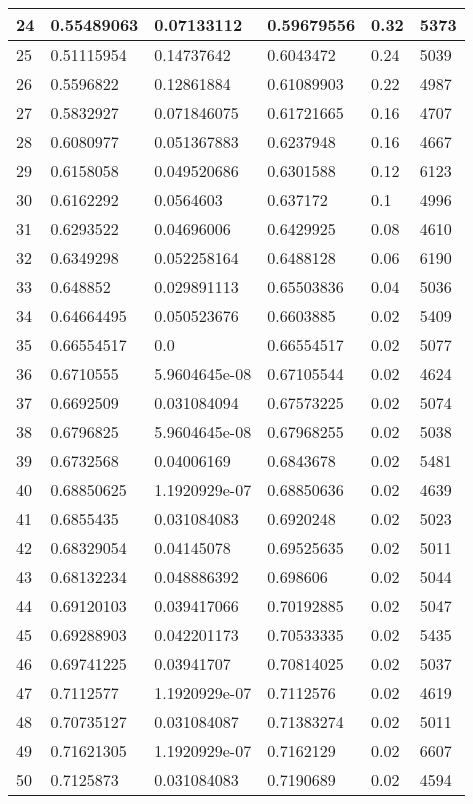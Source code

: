 \begin{longtable}{|l|l|l|l|l|l|}
24 & 0.55489063 & 0.07133112 & 0.59679556 & 0.32 & 5373 \\ \hline 
25 & 0.51115954 & 0.14737642 & 0.6043472 & 0.24 & 5039 \\ \hline 
26 & 0.5596822 & 0.12861884 & 0.61089903 & 0.22 & 4987 \\ \hline 
27 & 0.5832927 & 0.071846075 & 0.61721665 & 0.16 & 4707 \\ \hline 
28 & 0.6080977 & 0.051367883 & 0.6237948 & 0.16 & 4667 \\ \hline 
29 & 0.6158058 & 0.049520686 & 0.6301588 & 0.12 & 6123 \\ \hline 
30 & 0.6162292 & 0.0564603 & 0.637172 & 0.1 & 4996 \\ \hline 
31 & 0.6293522 & 0.04696006 & 0.6429925 & 0.08 & 4610 \\ \hline 
32 & 0.6349298 & 0.052258164 & 0.6488128 & 0.06 & 6190 \\ \hline 
33 & 0.648852 & 0.029891113 & 0.65503836 & 0.04 & 5036 \\ \hline 
34 & 0.64664495 & 0.050523676 & 0.6603885 & 0.02 & 5409 \\ \hline 
35 & 0.66554517 & 0.0 & 0.66554517 & 0.02 & 5077 \\ \hline 
36 & 0.6710555 & 5.9604645e-08 & 0.67105544 & 0.02 & 4624 \\ \hline 
37 & 0.6692509 & 0.031084094 & 0.67573225 & 0.02 & 5074 \\ \hline 
38 & 0.6796825 & 5.9604645e-08 & 0.67968255 & 0.02 & 5038 \\ \hline 
39 & 0.6732568 & 0.04006169 & 0.6843678 & 0.02 & 5481 \\ \hline 
40 & 0.68850625 & 1.1920929e-07 & 0.68850636 & 0.02 & 4639 \\ \hline 
41 & 0.6855435 & 0.031084083 & 0.6920248 & 0.02 & 5023 \\ \hline 
42 & 0.68329054 & 0.04145078 & 0.69525635 & 0.02 & 5011 \\ \hline 
43 & 0.68132234 & 0.048886392 & 0.698606 & 0.02 & 5044 \\ \hline 
44 & 0.69120103 & 0.039417066 & 0.70192885 & 0.02 & 5047 \\ \hline 
45 & 0.69288903 & 0.042201173 & 0.70533335 & 0.02 & 5435 \\ \hline 
46 & 0.69741225 & 0.03941707 & 0.70814025 & 0.02 & 5037 \\ \hline 
47 & 0.7112577 & 1.1920929e-07 & 0.7112576 & 0.02 & 4619 \\ \hline 
48 & 0.70735127 & 0.031084087 & 0.71383274 & 0.02 & 5011 \\ \hline 
49 & 0.71621305 & 1.1920929e-07 & 0.7162129 & 0.02 & 6607 \\ \hline 
50 & 0.7125873 & 0.031084083 & 0.7190689 & 0.02 & 4594 \\ \hline 
\end{longtable}